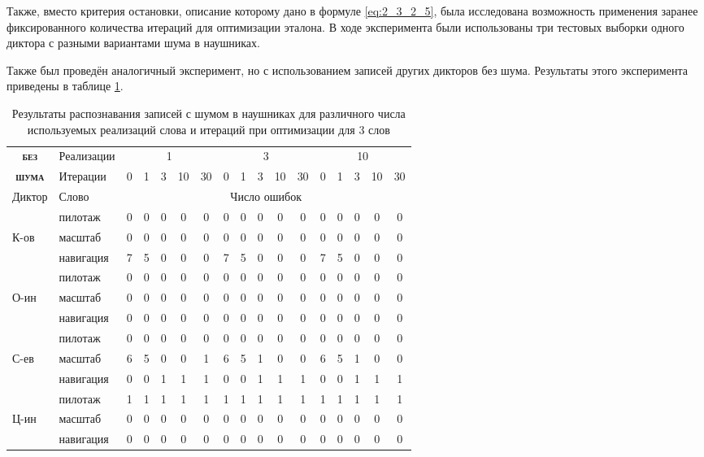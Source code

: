 Также, вместо критерия остановки, описание которому дано в формуле \eqref{eq:2_3_2_5}, была исследована возможность применения заранее фиксированного количества итераций для оптимизации эталона.
В ходе эксперимента были использованы три тестовых выборки одного диктора с разными вариантами шума в наушниках.

Также был проведён аналогичный эксперимент, но с использованием записей других дикторов без шума.
Результаты этого эксперимента приведены в таблице \ref{tab:subsect3_3_3_tab4}.

\begin{table}[h]
	\centering
	\caption{Результаты распознавания записей с шумом в наушниках для различного числа используемых реализаций слова и итераций при оптимизации для 3 слов}
	\label{tab:subsect3_3_3_tab4}
	{\small
		\begin{tabular}{ | l | l | c | c | c | c | c || c | c | c | c | c || c | c | c | c | c |}
			\hline
			\multicolumn{1}{|c|}{\textbf{\textsc{без}}} & Реализации\phantom{0000} & \multicolumn{5}{c||}{1} & \multicolumn{5}{c||}{3} & \multicolumn{5}{c|}{10} \\
			\cline{2-17}
			\multicolumn{1}{|c|}{\textbf{\textsc{\phantom{00}шума\phantom{00}}}} & Итерации & 0 & 1 & 3 & 10 & 30 & 0 & 1 & 3 & 10 & 30 & 0 & 1 & 3 & 10 & 30 \\
			\hline
			Диктор 		& Слово 	& \multicolumn{15}{c|}{Число ошибок}	\\
			\hline
					& пилотаж 	& 0  & 0  & 0  & 0  & 0    & 0  & 0  & 0  & 0  & 0    & 0  & 0  & 0  & 0  & 0  \\
			К-ов	& масштаб 	& 0  & 0  & 0  & 0  & 0    & 0  & 0  & 0  & 0  & 0    & 0  & 0  & 0  & 0  & 0  \\
					& навигация & 7  & 5  & 0  & 0  & 0    & 7  & 5  & 0  & 0  & 0    & 7  & 5  & 0  & 0  & 0  \\
			\hline
					& пилотаж 	& 0  & 0  & 0  & 0  & 0    & 0  & 0  & 0  & 0  & 0    & 0  & 0  & 0  & 0  & 0  \\
			О-ин	& масштаб 	& 0  & 0  & 0  & 0  & 0    & 0  & 0  & 0  & 0  & 0    & 0  & 0  & 0  & 0  & 0  \\
					& навигация & 0  & 0  & 0  & 0  & 0    & 0  & 0  & 0  & 0  & 0    & 0  & 0  & 0  & 0  & 0  \\
			\hline
					& пилотаж 	& 0  & 0  & 0  & 0  & 0    & 0  & 0  & 0  & 0  & 0    & 0  & 0  & 0  & 0  & 0  \\
			С-ев	& масштаб 	& 6  & 5  & 0  & 0  & 1    & 6  & 5  & 1  & 0  & 0    & 6  & 5  & 1  & 0  & 0  \\
					& навигация & 0  & 0  & 1  & 1  & 1    & 0  & 0  & 1  & 1  & 1    & 0  & 0  & 1  & 1  & 1  \\
			\hline
					& пилотаж 	& 1  & 1  & 1  & 1  & 1    & 1  & 1  & 1  & 1  & 1    & 1  & 1  & 1  & 1  & 1  \\
			Ц-ин  	& масштаб 	& 0  & 0  & 0  & 0  & 0    & 0  & 0  & 0  & 0  & 0    & 0  & 0  & 0  & 0  & 0  \\
					& навигация & 0  & 0  & 0  & 0  & 0    & 0  & 0  & 0  & 0  & 0    & 0  & 0  & 0  & 0  & 0  \\
			\hline
		\end{tabular}
	}
\end{table}

